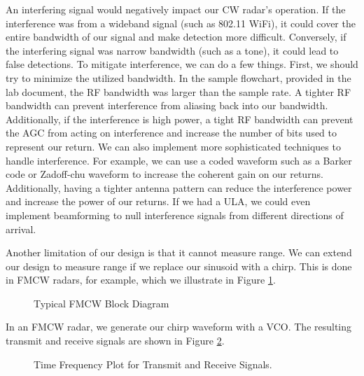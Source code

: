\documentclass{article}
\begin{document}
An interfering signal would negatively impact our CW radar's operation. If the interference was from a wideband signal (such as 802.11 WiFi), it could cover the entire bandwidth of our signal and make detection more difficult. Conversely, if the interfering signal was narrow bandwidth (such as a tone), it could lead to false detections. To mitigate interference, we can do a few things. First, we should try to minimize the utilized bandwidth. In the sample flowchart, provided in the lab document, the RF bandwidth was larger than the sample rate. A tighter RF bandwidth can prevent interference from aliasing back into our bandwidth. Additionally, if the interference is high power, a tight RF bandwidth can prevent the AGC from acting on interference and increase the number of bits used to represent our return. We can also implement more sophisticated techniques to handle interference. For example, we can use a coded waveform such as a Barker code or Zadoff-chu waveform to increase the coherent gain on our returns. Additionally, having a tighter antenna pattern can reduce the interference power and increase the power of our returns. If we had a ULA, we could even implement beamforming to null interference signals from different directions of arrival.

Another limitation of our design is that it cannot measure range. We can extend our design to measure range if we replace our sinusoid with a chirp. This is done in FMCW radars, for example, which we illustrate in Figure \ref{fig::fmcw_radar}.

\begin{figure}[H]
    	\centering
    	\caption{Typical FMCW Block Diagram \cite{9613183}}
    	\label{fig::fmcw_radar}
\end{figure}
	
\noindent In an FMCW radar, we generate our chirp waveform with a VCO. The resulting transmit and receive signals are shown in Figure \ref{fig::fmcw_spectrogram}.

\begin{figure}[H]
    	\centering
    	\caption{Time Frequency Plot for Transmit and Receive Signals.\cite{Long2019AssistingTV}}
    	\label{fig::fmcw_spectrogram}
\end{figure}
\end{document}
